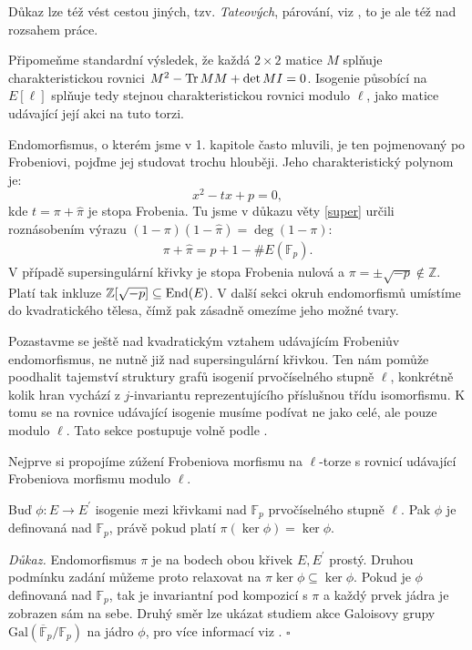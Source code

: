 \documentclass[12pt]{report}
\begin{document}
Důkaz lze též vést cestou jiných, tzv. \textit{Tateových}, párování, viz \cite[Prop. III.8.6., Prop. V.2.3.]{Silverman}, to je ale též nad rozsahem práce.

Připomeňme standardní výsledek, že každá $2 \times 2$ matice $M$ splňuje charakteristickou rovnici $M^2 - \operatorname{Tr} M M + \det M I = 0$. Isogenie působící na $E[\ell]$ splňuje tedy stejnou charakteristickou rovnici modulo $\ell$, jako matice udávající její akci na tuto torzi.

Endomorfismus, o kterém jsme v 1. kapitole často mluvili, je ten pojmenovaný po Frobeniovi, pojďme jej studovat trochu hlouběji. Jeho charakteristický polynom je:
\begin{equation*}
x^2 - tx + p = 0,
\end{equation*}
kde $t = \pi + \widehat{\pi}$ je stopa Frobenia. Tu jsme v důkazu věty \ref{super} určili roznásobením výrazu $(1-\pi)(1-\widehat{\pi}) = \deg (1 - \pi)$:
\begin{align*}
\pi + \widehat{\pi} = p+1-\# E(\mathbb{F}_p).
\end{align*}
V případě supersingulární křivky je stopa Frobenia nulová a $\pi =  \pm \sqrt{-p} \not\in \mathbb{Z}$. Platí tak inkluze $\mathbb{Z}[\sqrt{-p}] \subseteq \operatorname{End}(E)$. V další sekci okruh endomorfismů umístíme do kvadratického tělesa, čímž pak zásadně omezíme jeho možné tvary.

Pozastavme se ještě nad kvadratickým vztahem udávajícím Frobeniův endomorfismus, ne nutně již nad supersingulární křivkou. Ten nám pomůže poodhalit tajemství struktury grafů isogenií prvočíselného stupně $\ell$, konkrétně kolik hran vychází z $j$-invariantu reprezentujícího příslušnou třídu isomorfismu. K tomu se na rovnice udávající isogenie musíme podívat ne jako celé, ale pouze modulo $\ell$. Tato sekce postupuje volně podle \cite[Sec. 6]{Schoof2}.

Nejprve si propojíme zúžení Frobeniova morfismu na $\ell$-torze s rovnicí udávající Frobeniova morfismu modulo $\ell$.

\begin{lemma}
Buď $\phi : E \longrightarrow E^\prime$ isogenie mezi křivkami nad $\mathbb{F}_p$ prvočíselného stupně $\ell$. Pak $\phi$ je definovaná nad $\mathbb{F}_p$, právě pokud platí $\pi (\ker \phi) = \ker \phi$.
\end{lemma}
\noindent \textit{Důkaz.} Endomorfismus $\pi$ je na bodech obou křivek $E, E^\prime$ prostý. Druhou podmínku zadání můžeme proto relaxovat na $\pi \ker \phi \subseteq \ker \phi$. Pokud je $\phi$ definovaná nad $\mathbb{F}_p$, tak je invariantní pod kompozicí s $\pi$ a každý prvek jádra je zobrazen sám na sebe. Druhý směr lze ukázat studiem akce Galoisovy grupy $\mathrm{Gal}(\overline{\mathbb{F}}_p /\mathbb{F}_p)$ na jádro $\phi$, pro více informací viz \cite[Lemma 24.]{Suchanek}. \hfill $\square$\\
\end{document}
